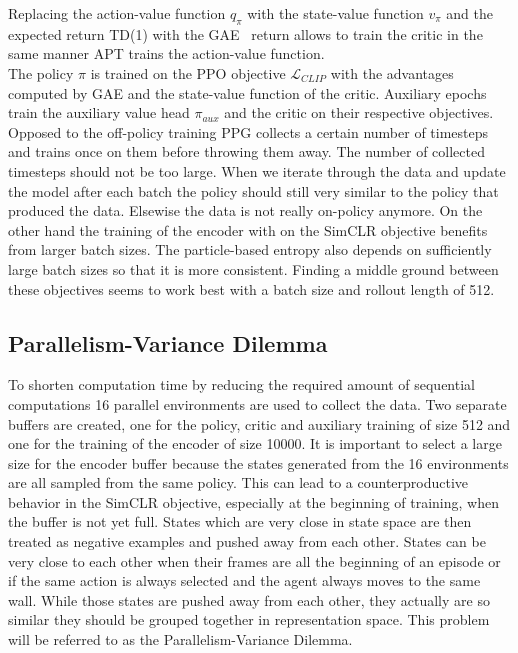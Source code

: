 \documentclass{article}
\begin{document}
\noindent Replacing the action-value function $q_\pi$ with the state-value function $v_\pi$ and the expected return TD(1)
with the GAE~\cite{Schulmanetal_ICLR2016} return allows to train the critic in the same manner APT trains the action-value function.\\
The policy $\pi$ is trained on the PPO objective $\mathcal{L}_{CLIP}$ with the advantages computed by GAE
and the state-value function of the critic.
Auxiliary epochs train the auxiliary value head $\pi_{aux}$ and the critic on their respective objectives.\\
Opposed to the off-policy training PPG collects a certain number of timesteps and trains 
once on them before throwing them away. The number of collected timesteps 
should not be too large. When we iterate through the data and update the model
after each batch the policy should still very similar to the policy that produced the
data. Elsewise the data is not really on-policy anymore.
On the other hand the training of the encoder with on the 
SimCLR objective benefits from larger batch sizes.
The particle-based entropy also depends on sufficiently large batch sizes so that it is more consistent.
Finding a middle ground between these objectives seems to work best with a batch size and rollout length of 512.

\subsection{Parallelism-Variance Dilemma}
To shorten computation time by reducing the required amount of sequential computations 
16 parallel environments are used to collect the data.
Two separate buffers are created, one for the policy, critic and auxiliary training of size 512
and one for the training of the encoder of size 10000. It is important to select a large size for the encoder buffer
because the states generated from the 16 environments are all sampled from the same policy. 
This can lead to a counterproductive behavior in the SimCLR objective, especially at the beginning
of training, when the buffer is not yet full.
States which are very close in state space are then treated as negative examples and pushed away from each other. 
States can be very close to each other when their frames are all the beginning of an episode or
if the same action is always selected and the agent always moves to the same wall.
While those states are pushed away from each other, they actually are
so similar they should be grouped together in representation space.
This problem will be referred to as the Parallelism-Variance Dilemma.
 
\end{document}
